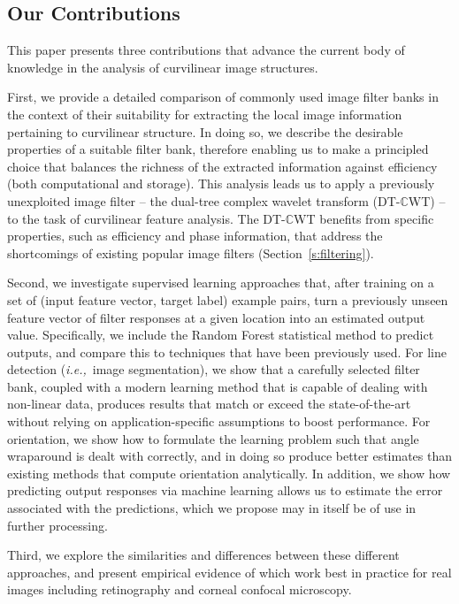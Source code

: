 \documentclass{IEEEtran}
\def\ie{\emph{i.e.,}}
\newcommand{\sref}[1]{Section~\ref{#1}}
\def\dtcwt{DT-$\mathbb{C}$WT}
\newcommand{\comment}[1]{}
\begin{document}
\subsection{Our Contributions}
This paper presents three contributions that advance the current body of knowledge in the analysis of curvilinear image structures.

First, we provide a detailed comparison of commonly used image filter banks in the context of their suitability for extracting the local image information pertaining to curvilinear structure. In doing so, we describe the desirable properties of a suitable filter bank, therefore enabling us to make a principled choice that balances the richness of the extracted information against efficiency (both computational and storage). This analysis leads us to apply a previously unexploited image filter -- the dual-tree complex wavelet transform (\dtcwt{}) -- to the task of curvilinear feature analysis. The \dtcwt{} benefits from specific properties, such as efficiency and phase information, that address the shortcomings of existing popular image filters (\sref{s:filtering}).

Second, we investigate supervised learning approaches that, after training on a set of (input feature vector, target label) example pairs, turn a previously unseen feature vector of filter responses at a given location into an estimated output value. Specifically, we include the Random Forest statistical method to predict outputs, and compare this to techniques that have been previously used. For line detection (\ie~image segmentation), we show that a carefully selected filter bank, coupled with a modern learning method that is capable of dealing with non-linear data, produces results that match or exceed the state-of-the-art without relying on application-specific assumptions to boost performance. For orientation, we show how to formulate the learning problem such that angle wraparound is dealt with correctly, and in doing so produce\comment{ significantly} better estimates than existing methods that compute orientation analytically. In addition, we show how predicting output responses via machine learning allows us to estimate the error associated with the predictions, which we propose may in itself be of use in further processing.

Third, we explore the similarities and differences between these different approaches, and present empirical evidence of which work best in practice for real images including retinography and corneal confocal microscopy.
\end{document}

